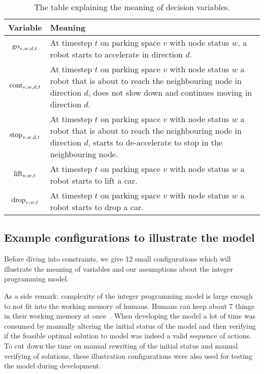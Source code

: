 \begin{table}[h]
    \center
    \begin{tabular}{| c | p{\textwidth - 2.6cm} |}
        \hline
        Variable & Meaning\\
        \hline
        $\mathrm{go}_{v,w,d,t}$ & At timestep $t$ on parking space $v$ with node status
        $w$, a robot starts to accelerate in direction $d$.\\ \hline
        $\mathrm{cont}_{v,w,d,t}$ & At timestep $t$ on parking space $v$ with node status
        $w$ a robot that is about to reach the neighbouring node in direction
        $d$, does not slow down and continues moving in direction $d$.\\ \hline
        $\mathrm{stop}_{v,w,d,t}$ & At timestep $t$ on parking space $v$ with node status
        $w$ a robot that is about to reach the neighbouring node in direction
        $d$, starts to de-accelerate to stop in the neighbouring node.\\ \hline
        $\mathrm{lift}_{v,w,t}$ & At timestep $t$ on parking space $v$ with node status
        $w$ a robot starts to lift a car.\\ \hline
        $\mathrm{drop}_{v,w,t}$ & At timestep $t$ on parking space $v$ with node status
        $w$ a robot starts to drop a car.\\
        \hline
    \end{tabular}
    \caption{The table explaining the meaning of decision variables.}
    \label{tbl:decvars}
\end{table}

\subsection{Example configurations to illustrate the model}
Before diving into constraints, we give 12 small configurations which will
illustrate the meaning of variables and our assumptions about the integer
programming model.

As a side remark: complexity of the integer programming model is large enough
to not fit into the working memory of humans. Humans can keep about 7 things in
their working memory at once~\cite{magic7}. When developing the model a lot of
time was consumed by manually altering the initial status of the model and then
verifying if the feasible optimal solution to model was indeed a valid sequence
of actions. To cut down the time on manual rewriting of the initial status and
manual verifying of solutions, these illustration configurations were also used
for testing the model during development.

